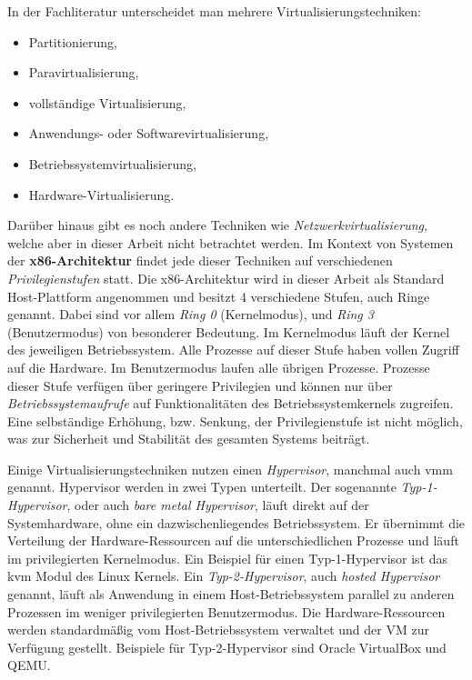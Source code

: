 In der Fachliteratur\cite{BSKompakt_Virt}\cite{BSGK_RBrause} unterscheidet man
mehrere Virtualisierungstechniken:
\begin{itemize}
    \item Partitionierung,
    \item Paravirtualisierung,
    \item vollständige Virtualisierung,
    \item Anwendungs- oder Softwarevirtualisierung,
    \item Betriebssystemvirtualisierung,
    \item Hardware-Virtualisierung.
\end{itemize}
Darüber hinaus gibt es noch andere Techniken wie
\textit{Netzwerkvirtualisierung}, welche aber in dieser Arbeit nicht betrachtet
werden.
Im Kontext von Systemen der \textbf{x86-Architektur} findet jede dieser
Techniken auf verschiedenen \textit{Privilegienstufen} statt.
Die x86-Architektur wird in dieser Arbeit als Standard Host-Plattform
angenommen und besitzt 4 verschiedene Stufen, auch Ringe
genannt\cite{BSKompakt_Syscall}.
\newline
Dabei sind vor allem \textit{Ring 0} (Kernelmodus), und \textit{Ring 3}
(Benutzermodus) von besonderer Bedeutung.
Im Kernelmodus läuft der Kernel des jeweiligen Betriebssystem. Alle Prozesse
auf dieser Stufe haben vollen Zugriff auf die Hardware\cite{BSKompakt_Syscall}.
\newline
Im Benutzermodus laufen alle übrigen Prozesse.
Prozesse dieser Stufe verfügen über geringere Privilegien und können nur über
\textit{Betriebssystemaufrufe} auf Funktionalitäten des Betriebssystemkernels
zugreifen\cite{BSKompakt_Syscall}.
Eine selbständige Erhöhung, bzw. Senkung, der Privilegienstufe ist nicht
möglich, was zur Sicherheit und Stabilität des gesamten Systems beiträgt.

Einige Virtualisierungstechniken nutzen einen \textit{Hypervisor}, manchmal
auch \ac{vmm} genannt.
Hypervisor werden in zwei Typen unterteilt.
\newline
Der sogenannte \textit{Typ-1-Hypervisor}, oder auch \textit{bare metal
Hypervisor}, läuft direkt auf der Systemhardware, ohne ein dazwischenliegendes
Betriebssystem.
Er übernimmt die Verteilung der Hardware-Ressourcen auf die unterschiedlichen
Prozesse und läuft im privilegierten Kernelmodus\cite{BSKompakt_Syscall}.
Ein Beispiel für einen Typ-1-Hypervisor ist das \ac{kvm} Modul des Linux
Kernels.
\newline
Ein \textit{Typ-2-Hypervisor}, auch \textit{hosted Hypervisor} genannt, läuft
als Anwendung in einem Host-Betriebssystem parallel zu anderen Prozessen im
weniger privilegierten Benutzermodus\cite{BSKompakt_Virt}.
Die Hardware-Ressourcen werden standardmäßig vom Host-Betriebssystem verwaltet
und der VM zur Verfügung gestellt.
Beispiele für Typ-2-Hypervisor sind Oracle VirtualBox und QEMU.

